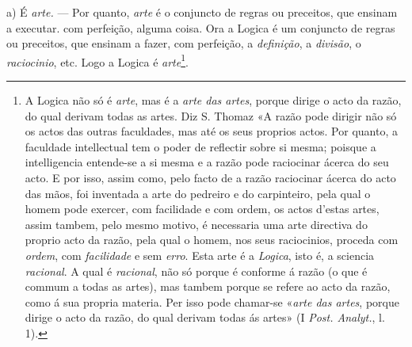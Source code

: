 a) É \emph{arte.} --- Por quanto, \emph{arte} é o conjuncto de regras ou   preceitos, que ensinam a executar. com perfeição, alguma coisa. Ora a Logica é um conjuncto de regras ou preceitos, que ensinam a fazer, com perfeição, a \emph{definição}, a \emph{divisão}, o \emph{raciocinio}, etc. Logo a Logica é \emph{arte}\footnote{A Logica não só é \emph{arte}, mas é a \emph{arte das artes}, porque dirige o acto da razão, do qual derivam todas as artes. Diz S. Thomaz «A razão pode dirigir não só os actos das outras faculdades, mas até os seus proprios actos. Por quanto, a faculdade intellectual tem o poder de reflectir sobre si mesma; poisque a intelligencia entende-se a si mesma e a razão pode raciocinar ácerca do seu acto. E por isso, assim como, pelo facto de a razão raciocinar ácerca do acto das mãos, foi inventada a arte do pedreiro e do carpinteiro, pela qual o homem pode exercer, com facilidade e com ordem, os actos d'estas artes, assim tambem, pelo mesmo motivo, é necessaria uma arte directiva do proprio acto da razão, pela qual o homem, nos seus raciocinios, proceda com \emph{ordem}, com \emph{facilidade} e sem \emph{erro}. Esta arte é a \emph{Logica}, isto é, a sciencia \emph{racional}. A qual é \emph{racional}, não só porque é conforme á razão (o que é commum a todas as artes), mas tambem porque se refere ao acto da razão, como á sua propria materia. Per isso pode chamar-se «\emph{arte das artes}, porque dirige o acto da razão, do qual derivam todas ás artes» (I \emph{Post. Analyt.}, l. 1).}.

